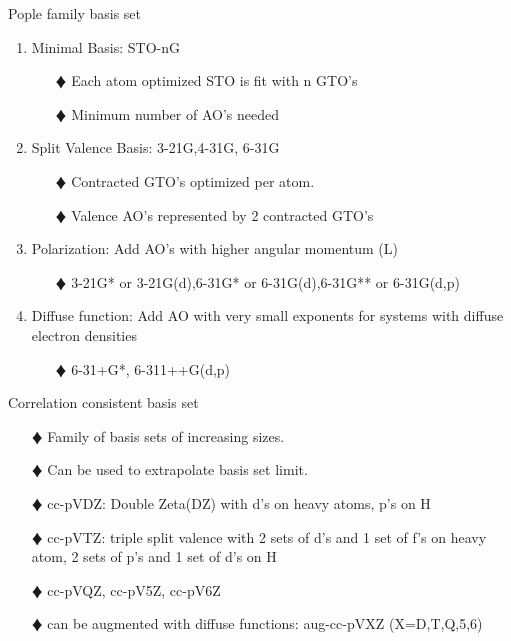 \documentclass[slidestop,mathserif,compress,xcolor=svgnames]{beamer}
\begin{document}
\begin{frame}
  \begin{block}{Pople family basis set}
    \begin{enumerate}
      \item Minimal Basis: STO-nG
      \begin{enumerate}
	\item[$\vardiamond$]Each atom optimized STO is fit with n GTO's
	\item[$\vardiamond$]Minimum number of AO's needed
      \end{enumerate}
      \item Split Valence Basis: 3-21G,4-31G, 6-31G
      \begin{enumerate}
	\item[$\vardiamond$]Contracted GTO's optimized per atom.
	\item[$\vardiamond$]Valence AO's represented by 2 contracted GTO's
      \end{enumerate}
      \item Polarization: Add AO's with higher angular momentum (L)
      \begin{enumerate}
	\item[$\vardiamond$]3-21G* or 3-21G(d),6-31G* or 6-31G(d),6-31G** or 6-31G(d,p)
      \end{enumerate}
      \item Diffuse function: Add AO with very small exponents for systems with diffuse electron densities
      \begin{enumerate}
	\item[$\vardiamond$]6-31+G*, 6-311++G(d,p)
      \end{enumerate}
    \end{enumerate}
  \end{block}
\end{frame}

\begin{frame}
  \begin{block}{Correlation consistent basis set}
    \begin{enumerate}
      \item[$\vardiamond$]Family of basis sets of increasing sizes.
      \item[$\vardiamond$]Can be used to extrapolate basis set limit.
      \item[$\vardiamond$]cc-pVDZ: Double Zeta(DZ) with d's on heavy atoms, p's on H
      \item[$\vardiamond$]cc-pVTZ: triple split valence with 2 sets of d's and 1 set of f's on heavy atom, 2 sets of p's and 1 set of d's on H
      \item[$\vardiamond$]cc-pVQZ, cc-pV5Z, cc-pV6Z
      \item[$\vardiamond$]can be augmented with diffuse functions: aug-cc-pVXZ (X=D,T,Q,5,6)
    \end{enumerate}
  \end{block}
\end{frame}
\end{document}
